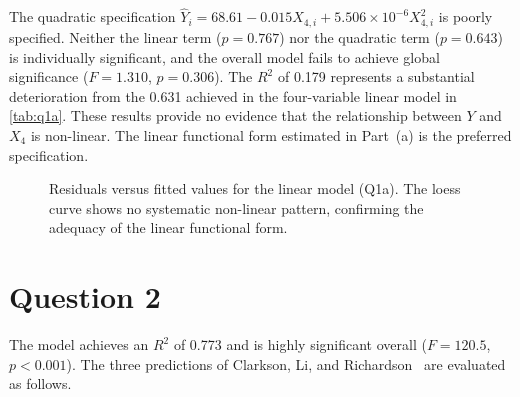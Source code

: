 \documentclass[11pt, a4paper]{article}
\begin{document}
\begin{table}[H]
	\centering
	
	\caption{Quadratic model results for equation~(Q1c).}\label{tab:q1c}
\end{table}

The quadratic specification \(\hat{Y}_i = 68.61 - 0.015X_{4,i} + 5.506 \times 10^{-6}X_{4,i}^2\) is poorly specified. Neither the linear term (\(p = 0.767\)) nor the quadratic term (\(p = 0.643\)) is individually significant, and the overall model fails to achieve global significance (\(F = 1.310\), \(p = 0.306\)). The \(R^2\) of 0.179 represents a substantial deterioration from the 0.631 achieved in the four-variable linear model in \cref{tab:q1a}. These results provide no evidence that the relationship between \(Y\) and \(X_4\) is non-linear. The linear functional form estimated in Part~(a) is the preferred specification.

\begin{figure}[H]
	\centering
	
	\caption{Residuals versus fitted values for the linear model (Q1a). The loess curve shows no systematic non-linear pattern, confirming the adequacy of the linear functional form.}\label{fig:q1_resid}
\end{figure}

\section{Question 2}

\begin{table}[H]
	\centering
	
	\caption{Market valuation model results for equation~(Q2).}\label{tab:q2_reg}
\end{table}

\begin{table}[H]
	\centering
	
	\caption{\(t\)-test for \(\beta_5 + \beta_6 = 0\).}\label{tab:q2_ttest}
\end{table}

\begin{table}[H]
	\centering
	
	\caption{\(F\)-test for \(\beta_5 + \beta_6 = 0\).}\label{tab:q2_ftest}
\end{table}

The model achieves an \(R^2\) of 0.773 and is highly significant overall (\(F = 120.5\), \(p < 0.001\)). The three predictions of Clarkson, Li, and Richardson~\cite{clarkson_market_2004} are evaluated as follows.
\end{document}
